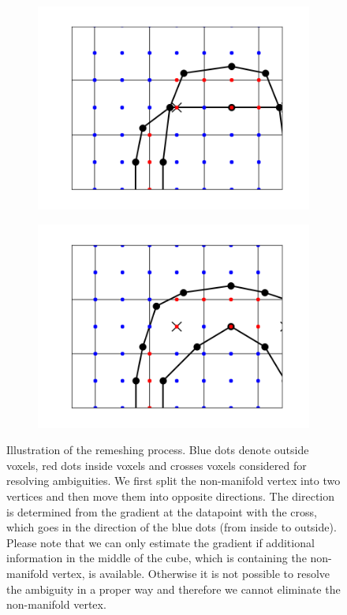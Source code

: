 \begin{figure}
\begin{center}
\begin{subfigure}{.5\linewidth}
\centering
\includegraphics[width = \textwidth]{Pictures/SurfaceReconstruction/2DDoubleTorusNonManifoldDetail}
\end{subfigure}%
\begin{subfigure}{.5\linewidth}
\centering
\includegraphics[width = \textwidth]{Pictures/SurfaceReconstruction/2DDoubleTorusManifoldDetail}
\end{subfigure}
\end{center}
\caption{Illustration of the remeshing process. Blue dots denote outside voxels, red dots inside voxels and crosses voxels considered for resolving ambiguities. We first split the non-manifold vertex into two vertices and then move them into opposite directions. The direction is determined from the gradient at the datapoint with the cross, which goes in the direction of the blue dots (from inside to outside). Please note that we can only estimate the gradient if additional information in the middle of the cube, which is containing the non-manifold vertex, is available. Otherwise it is not possible to resolve the ambiguity in a proper way and therefore we cannot eliminate the non-manifold vertex.}

\end{figure}
